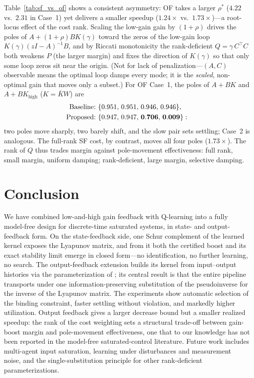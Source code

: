 \documentclass[final,5p,times,authoryear]{elsarticle}
\theoremstyle{plain}
\theoremstyle{definition}
\theoremstyle{remark}
\begin{document}
Table~\ref{tab:sf_vs_of} shows a consistent asymmetry: OF takes a
larger $\rho^{*}$ ($4.22$ vs.\ $2.31$ in Case~1) yet delivers a
smaller speedup ($1.24\times$ vs.\ $1.73\times$)---a root-locus effect
of the cost rank.  Scaling the low-gain gain by $(1+\rho)$ drives the poles
of $A + (1+\rho)BK(\gamma)$ toward the zeros of the low-gain loop
$K(\gamma)(zI-A)^{-1}B$, and by Riccati monotonicity the
rank-deficient $Q=\gamma\,C^{\!\top}\!C$ both weakens $P$ (the larger
margin) and fixes the direction of $K(\gamma)$ so that only some loop
zeros sit near the origin.  (Not for lack of penalization---$(A,C)$ observable means the optimal
loop damps every mode; it is the \emph{scaled}, non-optimal gain that
moves only a subset.)  For OF Case~1, the poles of $A + BK$ and
$A + BK_{\mathrm{high}}$ ($K = \bar K W$) are
\begin{align}
\text{Baseline:}\ &\{0.951,\,0.951,\,0.946,\,0.946\},\notag\\
\text{Proposed:}\ &\{0.947,\,0.947,\,\mathbf{0.706},\,\mathbf{0.009}\}:
\end{align}
two poles move sharply, two barely shift, and the slow pair sets
settling; Case~2 is analogous.  The full-rank SF cost, by contrast,
moves all four poles ($1.73\times$).  The rank of $Q$ thus trades
margin against pole-movement effectiveness: full rank, small margin,
uniform damping; rank-deficient, large margin, selective damping.


\FloatBarrier

\section{Conclusion}\label{sec:conclusion}

We have combined low-and-high gain feedback with Q-learning into a
fully model-free design for discrete-time saturated systems, in state-
and output-feedback form.  On the state-feedback side, one Schur
complement of the learned kernel exposes the Lyapunov matrix, and from
it both the certified boost and its exact stability limit emerge in
closed form---no identification, no further learning, no search.  The
output-feedback extension builds its kernel from input--output
histories via the parameterization of \citet{RizviLin2023book}; its
central result is that the entire pipeline transports under one
information-preserving substitution of the pseudoinverse for the
inverse of the Lyapunov matrix.  The experiments show automatic selection of the binding constraint,
faster settling without violation, and markedly higher utilization.  Output feedback gives a larger decrease bound but a smaller realized
speedup: the rank of the cost weighting sets a structural trade-off
between gain-boost margin and pole-movement effectiveness, one that to
our knowledge has not been reported in the model-free
saturated-control literature.
Future work includes multi-agent input saturation, learning under
disturbances and measurement noise, and the single-substitution
principle for other rank-deficient parameterizations.
\end{document}
